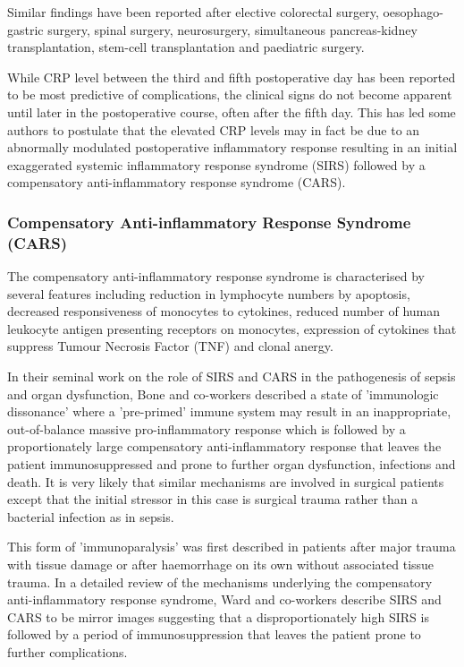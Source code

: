 Similar findings have been reported after elective colorectal surgery\parencite{ortega-deballon_c-reactive_2010, woeste_increased_2010}, oesophago-gastric surgery\parencite{dutta_persistent_2011}, spinal surgery\parencite{meyer_c-reactive_1995,mok_use_2008}, neurosurgery\parencite{al-jabi_value_2010}, simultaneous pancreas-kidney transplantation\parencite{wullstein_high_2004}, stem-cell transplantation\parencite{mcneer_early_2010} and paediatric surgery\parencite{laporta_baez_c-reactive_2011}.

While CRP level between the third and fifth postoperative day has been reported to be most predictive of complications,  the clinical signs do not become apparent until later in the postoperative course, often after the fifth day. This has led some authors to postulate that the elevated CRP levels may in fact be due to an abnormally modulated postoperative inflammatory response resulting in an initial exaggerated systemic inflammatory response syndrome (SIRS) followed by a compensatory anti-inflammatory response syndrome (CARS). 

\subsubsection{Compensatory Anti-inflammatory Response Syndrome (CARS)}
The compensatory anti-inflammatory response syndrome is characterised by several features including reduction in lymphocyte numbers by apoptosis, decreased responsiveness of monocytes to cytokines, reduced number of human leukocyte antigen presenting receptors on monocytes, expression of cytokines that suppress Tumour Necrosis Factor (TNF) and clonal anergy.

In their seminal work on the role of SIRS and CARS in the pathogenesis of sepsis and organ dysfunction, Bone and co-workers described a state of 'immunologic dissonance' where a 'pre-primed' immune system may result in an inappropriate, out-of-balance massive pro-inflammatory response which is followed by a proportionately large compensatory anti-inflammatory response that leaves the patient immunosuppressed and prone to further organ dysfunction, infections and death. \parencite{bone_sepsis:_1997, bone_immunologic_1996} It is very likely that similar mechanisms are involved in surgical patients except that the initial stressor in this case is surgical trauma rather than a bacterial infection as in sepsis. 

This form of 'immunoparalysis' was first described in patients after major trauma with tissue damage \parencite{abraham_effects_1985,bandyopadhyay_negative_2007} or after haemorrhage on its own without associated tissue trauma. \parencite{stephan_hemorrhage_1987} In a detailed review of the mechanisms underlying the compensatory anti-inflammatory response syndrome, Ward and co-workers describe SIRS and CARS to be mirror images suggesting that a disproportionately high SIRS is followed by a period of immunosuppression that leaves the patient prone to further complications.\parencite{ward_compensatory_2008}

